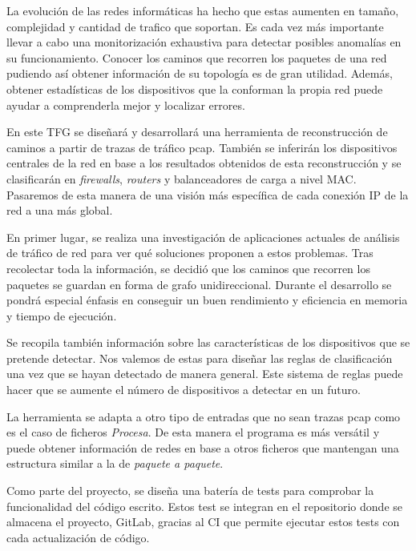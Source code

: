 La evolución de las redes informáticas ha hecho que estas aumenten en tamaño, complejidad y cantidad de trafico que soportan. Es cada vez más importante llevar a cabo una monitorización exhaustiva para detectar posibles anomalías en su funcionamiento. Conocer los caminos que recorren los paquetes de una red pudiendo así obtener información de su topología es de gran utilidad. Además, obtener estadísticas de los dispositivos que la conforman la propia red puede ayudar a comprenderla mejor y localizar errores.

En este TFG se diseñará y desarrollará una herramienta de reconstrucción de caminos a partir de trazas de tráfico pcap. También se inferirán los dispositivos centrales de la red en base a los resultados obtenidos de esta reconstrucción y se clasificarán en \textit{firewalls}, \textit{routers} y balanceadores de carga a nivel MAC. Pasaremos de esta manera de una visión más específica de cada conexión IP de la red a una más global.

En primer lugar, se realiza una investigación de aplicaciones actuales de análisis de tráfico de red para ver qué soluciones proponen a estos problemas. Tras recolectar toda la información, se decidió que los caminos que recorren los paquetes se guardan en forma de grafo unidireccional. Durante el desarrollo se pondrá especial énfasis en conseguir un buen rendimiento y eficiencia en memoria y tiempo de ejecución.

Se recopila también información sobre las características de los dispositivos que se pretende detectar. Nos valemos de estas para diseñar las reglas de clasificación una vez que se hayan detectado de manera general. Este sistema de reglas puede hacer que se aumente el número de dispositivos a detectar en un futuro.

La herramienta se adapta a otro tipo de entradas que no sean trazas pcap como es el caso de ficheros \textit{Procesa}. De esta manera el programa es más versátil y puede obtener información de redes en base a otros ficheros que mantengan una estructura similar a la de \textit{paquete a paquete}.

Como parte del proyecto, se diseña una batería de tests para comprobar la funcionalidad del código escrito. Estos test se integran en el repositorio donde se almacena el proyecto, GitLab, gracias al CI que permite ejecutar estos tests con cada actualización de código.


